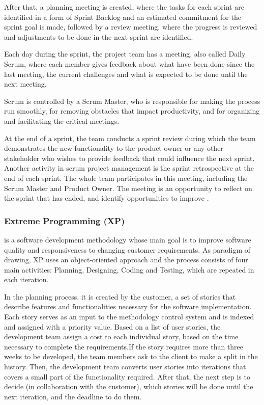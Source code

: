 After that, a planning meeting is created, where the tasks for each sprint are identified in a form of Sprint Backlog and an estimated commitment for the sprint goal is made, followed by a review meeting, where the progress is reviewed and adjustments to be done in the next sprint are identified.

Each day during the sprint, the project team has a meeting, also called Daily Scrum, where each member gives feedback about what have been done since the last meeting, the current challenges and what is expected to be done until the next meeting.

Scrum is controlled by a Scrum Master, who is responsible for making the process run smoothly, for removing obstacles that impact productivity, and for organizing and facilitating the critical meetings. 

At the end of a sprint, the team conducts a sprint review during which the team demonstrates the new functionality to the product owner or any other stakeholder who wishes to provide feedback that could influence the next sprint.
Another activity in scrum project management is the sprint retrospective at the end of each sprint. The whole team participates in this meeting, including the Scrum Master and Product Owner. The meeting is an opportunity to reflect on the sprint that has ended, and identify opportunities to improve \cite{agile:scrum}.

\subsubsection{Extreme Programming (XP)}

is a software development methodology whose main goal is to improve software quality and responsiveness to changing customer requirements. As paradigm of drawing, XP uses an object-oriented approach and the process consists of four main activities: Planning, Designing, Coding and Testing, which are repeated in each iteration.

In the planning process, it is created by the customer, a set of stories that describe features and functionalities necessary for the software implementation. Each story serves as an input to the methodology control system and is indexed and assigned with a priority value. Based on a list of user stories, the development team assign a cost to each individual story, based on the time necessary to complete the requirements.If the story requires more than three weeks to be developed, the team members ask to the client to make a split in the history. Then, the development team converts user stories into iterations that covers a small part of the functionality required. 
After that, the next step is to decide (in collaboration with the customer), which stories will be done until the next iteration, and the deadline to do them.

